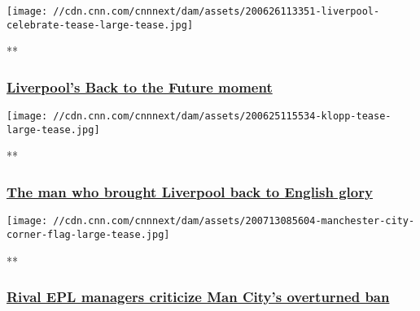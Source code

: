 \texttt{[image: //cdn.cnn.com/cnnnext/dam/assets/200626113351-liverpool-celebrate-tease-large-tease.jpg]}

**

\hypertarget{liverpools-back-to-the-future-moment}{%
\subsubsection{\texorpdfstring{\href{/videos/sports/2020/06/26/liverpool-back-to-the-future-1990-2020-premier-league-title-football-spt-intl-lon-orig.cnn}{Liverpool's
Back to the Future
moment}}{Liverpool's Back to the Future moment}}\label{liverpools-back-to-the-future-moment}}

\href{/videos/sports/2020/06/25/jurgen-klopp-liverpool-premier-league-title-win-culture-change-football-spt-intl-lon-orig-cmd.cnn}{}

\texttt{[image: //cdn.cnn.com/cnnnext/dam/assets/200625115534-klopp-tease-large-tease.jpg]}

**

\hypertarget{the-man-who-brought-liverpool-back-to-english-glory}{%
\subsubsection{\texorpdfstring{\href{/videos/sports/2020/06/25/jurgen-klopp-liverpool-premier-league-title-win-culture-change-football-spt-intl-lon-orig-cmd.cnn}{The
man who brought Liverpool back to English
glory}}{The man who brought Liverpool back to English glory}}\label{the-man-who-brought-liverpool-back-to-english-glory}}

\href{/videos/sports/2020/07/15/premier-league-managers-manchester-city-ffp-ban-overturned-pep-guardiola-klopp-mourinho-spt-intl.cnn}{}

\texttt{[image: //cdn.cnn.com/cnnnext/dam/assets/200713085604-manchester-city-corner-flag-large-tease.jpg]}

**

\hypertarget{rival-epl-managers-criticize-man-citys-overturned-ban}{%
\subsubsection{\texorpdfstring{\href{/videos/sports/2020/07/15/premier-league-managers-manchester-city-ffp-ban-overturned-pep-guardiola-klopp-mourinho-spt-intl.cnn}{Rival
EPL managers criticize Man City's overturned
ban}}{Rival EPL managers criticize Man City's overturned ban}}\label{rival-epl-managers-criticize-man-citys-overturned-ban}}


